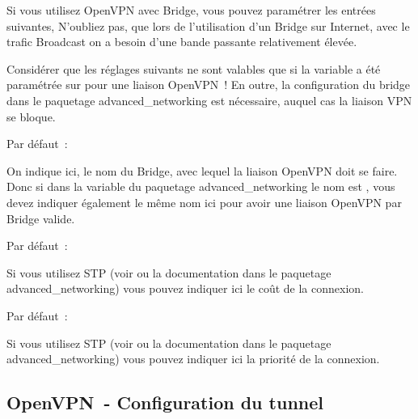   Si vous utilisez OpenVPN avec Bridge, vous pouvez paramétrer les entrées
  suivantes, N'oubliez pas, que lors de l'utilisation d'un Bridge sur Internet,
  avec le trafic Broadcast on a besoin d'une bande passante relativement élevée.

  Considérer que les réglages suivants ne sont valables que si la variable
   a été paramétrée sur 
  pour une liaison OpenVPN~! En outre, la configuration du bridge dans le
  paquetage advanced\_networking est nécessaire, auquel cas la liaison VPN
  se bloque.

\begin{description}


  Par défaut~: 

  On indique ici, le nom du Bridge, avec lequel la liaison OpenVPN doit se faire.
  Donc si dans la variable  du paquetage
  advanced\_networking le nom est , vous devez indiquer
  également le même nom ici pour avoir une liaison OpenVPN par Bridge valide.


  Par défaut~: 

  Si vous utilisez STP (voir 
  ou la documentation dans le paquetage advanced\_networking) vous pouvez
  indiquer ici le coût de la connexion.


  Par défaut~: 

  Si vous utilisez STP (voir 
  ou la documentation dans le paquetage advanced\_networking) vous pouvez indiquer
  ici la priorité de la connexion.

\end{description}


\subsection{OpenVPN~- Configuration du tunnel}

